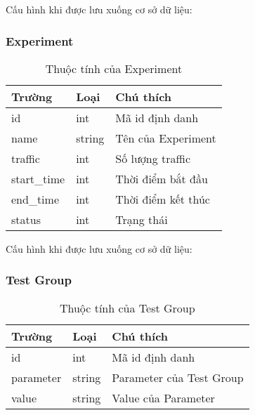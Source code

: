 Cấu hình khi được lưu xuống cơ sở dữ liệu:

\begin{itemize}
\end{itemize}

\subsubsection{Experiment}

\begin{table}[H]
	\centering
	\begin{tabular}{|l|l|l|}
		\hline
		Trường      & Loại   & Chú thích          \\ \hline
		id          & int    & Mã id định danh          \\ \hline
		name        & string & Tên của Experiment \\ \hline
		traffic     & int    & Số lượng traffic   \\ \hline
		start\_time & int    & Thời điểm bắt đầu  \\ \hline
		end\_time   & int    & Thời điểm kết thúc \\ \hline
		status      & int    & Trạng thái         \\ \hline
	\end{tabular}
	\caption{Thuộc tính của Experiment}
\end{table}

Cấu hình khi được lưu xuống cơ sở dữ liệu:

\begin{itemize}
\end{itemize}

\subsubsection{Test Group}

\begin{table}[H]
	\centering
	\begin{tabular}{|l|l|l|}
		\hline
		Trường    & Loại   & Chú thích                \\ \hline
		id        & int    & Mã id định danh                \\ \hline
		parameter & string & Parameter của Test Group \\ \hline
		value     & string & Value của Parameter      \\ \hline
	\end{tabular}
	\caption{Thuộc tính của Test Group}
\end{table}

